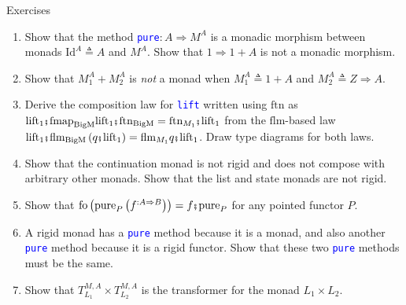 \documentclass[english]{beamer}
\newcommand{\bef}{\hspace{0.5pt}\ensuremath\mathsmaller{\fatsemi}\hspace{1.5pt}}
\begin{document}
\begin{frame}{Exercises}
\begin{enumerate}
\item {\small{}Show that the method }\texttt{\textcolor{blue}{\footnotesize{}pure}}{\small{}$:A\Rightarrow M^{A}$
is a monadic morphism between monads $\text{Id}^{A}\triangleq A$
and $M^{A}$. Show that $1\Rightarrow1+A$ is not a monadic morphism.}{\small\par}
\item {\small{}Show that $M_{1}^{A}+M_{2}^{A}$ is }\emph{\small{}not}{\small{}
a monad when $M_{1}^{A}\triangleq1+A$ and $M_{2}^{A}\triangleq Z\Rightarrow A$.}{\small\par}
\item {\small{}Derive the composition law for }\texttt{\textcolor{blue}{\footnotesize{}lift}}{\small{}
written using $\text{ftn}$ as $\text{lift}_{1}\bef\text{fmap}_{\text{BigM}}\text{lift}_{1}\bef\text{ftn}_{\text{BigM}}=\text{ftn}_{M_{1}}\bef\text{lift}_{1}$
from the $\text{flm}$-based law $\text{lift}_{1}\bef\text{flm}_{\text{BigM}}\left(q\bef\text{lift}_{1}\right)=\text{flm}_{M_{1}}q\bef\text{lift}_{1}$.
Draw type diagrams for both laws.}{\small\par}
\item {\small{}Show that the continuation monad is not rigid and does not
compose with arbitrary other monads. Show that the list and state
monads are not rigid.}{\small\par}
\item {\small{}Show that }{\footnotesize{}$\text{fo}\left(\text{pure}_{P}\left(f^{:A\Rightarrow B}\right)\right)=f\bef\text{pure}_{P}$}{\small{}
for any pointed functor $P$.}{\small\par}
\item {\small{}A rigid monad has a }\texttt{\textcolor{blue}{\footnotesize{}pure}}{\small{}
method because it is a monad, and also another }\texttt{\textcolor{blue}{\footnotesize{}pure}}{\small{}
method because it is a rigid functor. Show that these two }\texttt{\textcolor{blue}{\footnotesize{}pure}}{\small{}
methods must be the same.}{\small\par}
\item {\small{}Show that $T_{L_{1}}^{M,A}\times T_{L_{2}}^{M,A}$ is the
transformer for the monad $L_{1}\times L_{2}$.} 
\end{enumerate}
\end{frame}
\end{document}
